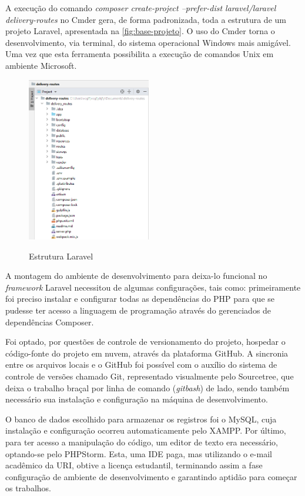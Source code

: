 A execução do comando \textit{composer create-project --prefer-dist laravel/laravel delivery-routes} no Cmder gera, de forma padronizada, toda a estrutura de um projeto Laravel, apresentada na \autoref{fig:base-projeto}. O uso do Cmder torna o desenvolvimento, via terminal, do sistema operacional Windows mais amigável. Uma vez que esta ferramenta possibilita a execução de comandos Unix em ambiente Microsoft.

\begin{figure}[H]
    \centering
    \caption{Estrutura Laravel}
    \includegraphics[width=0.48\textwidth]{./dados/figuras/fig6}
    \label{fig:base-projeto}
\end{figure}

A montagem do ambiente de desenvolvimento para deixa-lo funcional no \textit{framework} Laravel necessitou de algumas configurações, tais como: primeiramente foi preciso instalar e configurar todas as dependências do PHP para que se pudesse ter acesso a linguagem de programação através do gerenciados de dependências Composer.

Foi optado, por questões de controle de versionamento do projeto, hospedar o código-fonte do projeto em nuvem, através da plataforma GitHub. A sincronia entre os arquivos locais e o GitHub foi possível com o auxílio do sistema de controle de versões chamado Git, representado visualmente pelo Sourcetree, que deixa o trabalho braçal por linha de comando (\textit{gitbash}) de lado, sendo também necessário sua instalação e configuração na máquina de desenvolvimento. 

O banco de dados escolhido para armazenar os registros foi o MySQL, cuja instalação e configuração ocorreu automaticamente pelo XAMPP. Por último, para ter acesso a manipulação do código, um editor de texto era necessário, optando-se pelo PHPStorm. Esta, uma IDE paga, mas utilizando o e-mail acadêmico da URI, obtive a licença estudantil, terminando assim a fase configuração de ambiente de desenvolvimento e garantindo aptidão para começar os trabalhos.

